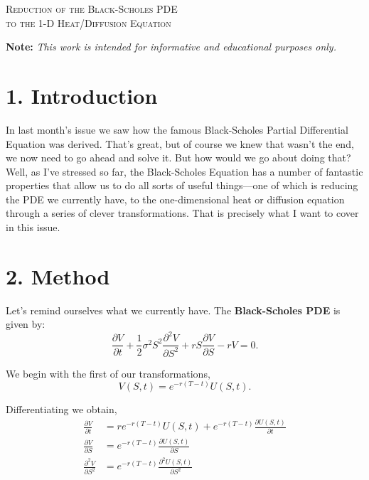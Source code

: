 \documentclass[11pt]{article}
\begin{document}

\begin{tcolorbox}
\begin{center}
    \large
    \textsc{Reduction of the Black-Scholes PDE \\ to the 1-D Heat/Diffusion Equation}
\end{center}
\end{tcolorbox}

\begin{center}
\textbf{Note:} \textit{This work is intended for informative and educational purposes only.}
\end{center}

\section*{1. Introduction}
In last month's issue we saw how the famous Black-Scholes Partial Differential Equation was derived. That's great, but of course we knew that wasn't the end, we now need to go ahead and solve it. But how would we go about doing that? Well, as I've stressed so far, the Black-Scholes Equation has a number of fantastic properties that allow us to do all sorts of useful things––one of which is reducing the PDE we currently have, to the one-dimensional heat or diffusion equation through a series of clever transformations. That is precisely what I want to cover in this issue.

\section*{2. Method}
Let's remind ourselves what we currently have. The \textbf{Black-Scholes PDE} is given by:
\begin{equation}
    \frac{\partial V}{\partial t} + \frac{1}{2} \sigma^2 S^2 \frac{\partial^2 V}{\partial S^2} + rS \frac{\partial V}{\partial S} - rV = 0.    
\end{equation}

We begin with the first of our transformations,
\begin{equation}
    V(S,t) = e^{-r(T-t)} U(S,t).
\end{equation}

Differentiating we obtain,
\begin{align}
    \frac{\partial V}{\partial t} &= r e^{-r(T-t)} U(S,t) + e^{-r(T-t)} \frac{\partial U(S,t)}{\partial t} \\
    \frac{\partial V}{\partial S} &= e^{-r(T-t)} \frac{\partial U(S,t)}{\partial S} \\
    \frac{\partial^2 V}{\partial S^2} &= e^{-r(T-t)} \frac{\partial^2 U(S,t)}{\partial S^2}
\end{align}
\end{document}
